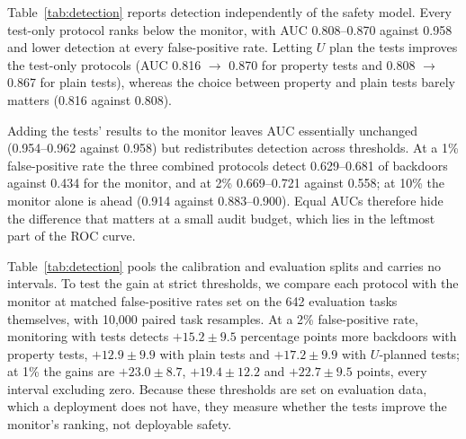Table~\ref{tab:detection} reports detection independently of the safety model. Every test-only
protocol ranks below the monitor, with AUC 0.808--0.870 against 0.958 and lower detection at every
false-positive rate. Letting $U$ plan the tests improves the test-only protocols (AUC 0.816 $\to$
0.870 for property tests and 0.808 $\to$ 0.867 for plain tests), whereas the choice between
property and plain tests barely matters (0.816 against 0.808).

Adding the tests' results to the monitor leaves AUC essentially unchanged (0.954--0.962 against
0.958) but redistributes detection across thresholds. At a 1\% false-positive rate the three
combined protocols detect 0.629--0.681 of backdoors against 0.434 for the monitor, and at 2\%
0.669--0.721 against 0.558; at 10\% the monitor alone is ahead (0.914 against 0.883--0.900). Equal
AUCs therefore hide the difference that matters at a small audit budget, which lies in the leftmost
part of the ROC curve.

Table~\ref{tab:detection} pools the calibration and evaluation splits and carries no intervals. To
test the gain at strict thresholds, we compare each protocol with the monitor at matched
false-positive rates set on the 642 evaluation tasks themselves, with 10{,}000 paired task
resamples. At a 2\% false-positive rate, monitoring with tests detects $+15.2 \pm 9.5$ percentage
points more backdoors with property tests, $+12.9 \pm 9.9$ with plain tests and $+17.2 \pm 9.9$
with $U$-planned tests; at 1\% the gains are $+23.0 \pm 8.7$, $+19.4 \pm 12.2$ and
$+22.7 \pm 9.5$ points, every interval excluding zero. Because these thresholds are set on
evaluation data, which a deployment does not have, they measure whether the tests improve the
monitor's ranking, not deployable safety.

